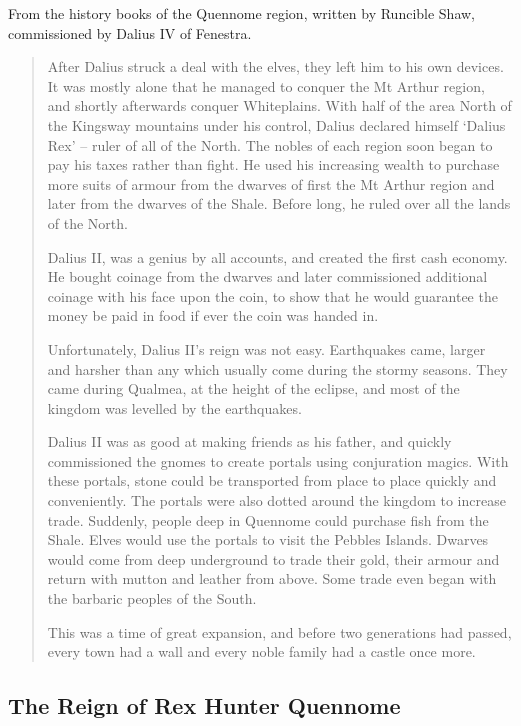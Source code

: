 \begin{multicols}{2}
From the history books of the Quennome region, written by Runcible Shaw, commissioned by Dalius IV of Fenestra.

\begin{quotation}

  After Dalius struck a deal with the elves, they left him to his own devices.
  It was mostly alone that he managed to conquer the Mt Arthur region, and shortly afterwards conquer Whiteplains.
  With half of the area North of the Kingsway mountains under his control, Dalius declared himself `Dalius Rex' -- ruler of all of the North.
  The nobles of each region soon began to pay his taxes rather than fight.
  He used his increasing wealth to purchase more suits of armour from the dwarves of first the Mt Arthur region and later from the dwarves of the Shale.
  Before long, he ruled over all the lands of the North.

  Dalius II, was a genius by all accounts, and created the first cash economy.
  He bought coinage from the dwarves and later commissioned additional coinage with his face upon the coin, to show that he would guarantee the money be paid in food if ever the coin was handed in.

  Unfortunately, Dalius II's reign was not easy.
  Earthquakes came, larger and harsher than any which usually come during the stormy seasons.
  They came during Qualmea, at the height of the eclipse, and most of the kingdom was levelled by the earthquakes.

  Dalius II was as good at making friends as his father, and quickly commissioned the gnomes to create portals using conjuration magics.
  With these portals, stone could be transported from place to place quickly and conveniently.
  The portals were also dotted around the kingdom to increase trade.
  Suddenly, people deep in Quennome could purchase fish from the Shale.
  Elves would use the portals to visit the Pebbles Islands.
  Dwarves would come from deep underground to trade their gold, their armour and return with mutton and leather from above.
  Some trade even began with the barbaric peoples of the South.

  This was a time of great expansion, and before two generations had passed, every town had a wall and every noble family had a castle once more.

\end{quotation}

\subsection{The Reign of Rex Hunter Quennome}


\end{multicols}

